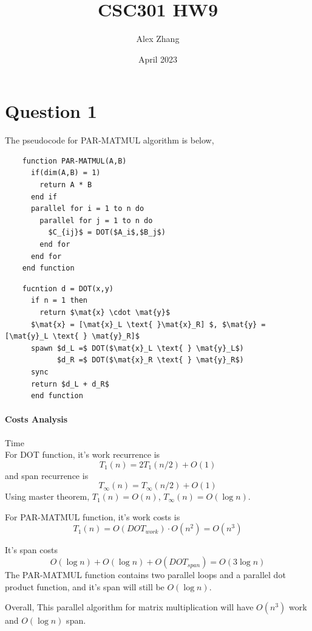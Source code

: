 \documentclass{article}
\title{CSC301 HW9}
\author{Alex Zhang}
\date{April 2023}
\newcommand{\mat}[1]{\mathbf{#1}}
\begin{document}
\maketitle

\section*{Question 1}

The pseudocode for PAR-MATMUL algorithm is below,
\begin{multicols}{2}
  \begin{lstlisting}
    function PAR-MATMUL(A,B)
      if(dim(A,B) = 1)
        return A * B
      end if
      parallel for i = 1 to n do
        parallel for j = 1 to n do
          $C_{ij}$ = DOT($A_i$,$B_j$)
        end for
      end for
    end function
  \end{lstlisting}
  \begin{lstlisting}
    fucntion d = DOT(x,y)
      if n = 1 then
        return $\mat{x} \cdot \mat{y}$
      $\mat{x} = [\mat{x}_L \text{ }\mat{x}_R] $, $\mat{y} = [\mat{y}_L \text{ } \mat{y}_R]$
      spawn $d_L =$ DOT($\mat{x}_L \text{ } \mat{y}_L$)
            $d_R =$ DOT($\mat{x}_R \text{ } \mat{y}_R$)
      sync 
      return $d_L + d_R$ 
      end function
  \end{lstlisting}
\end{multicols} 
\paragraph{Costs Analysis} Time\\

For DOT function, it's work recurrence is 
$$T_1(n) = 2T_1(n/2) + O(1)$$
and span recurrence is 
$$T_{\infty}(n) = T_{\infty}(n/2) + O(1)$$
Using master theorem, $T_1(n) = O(n)$, $T_{\infty}(n) = O(\log n)$.


For PAR-MATMUL function, it's work costs is 
$$T_1(n) = O(DOT_{work}) \cdot O(n^2) = O(n^3)$$

It's span costs $$O(\log n) + O(\log n) + O(DOT_{span}) = O(3\log n)$$
The PAR-MATMUL function contains two parallel loops and a parallel dot product function, and it's span will
still be $O(\log n)$.



Overall, This parallel algorithm for matrix multiplication will have $O(n^3)$ work and $O(\log n)$ span.
\end{document}

